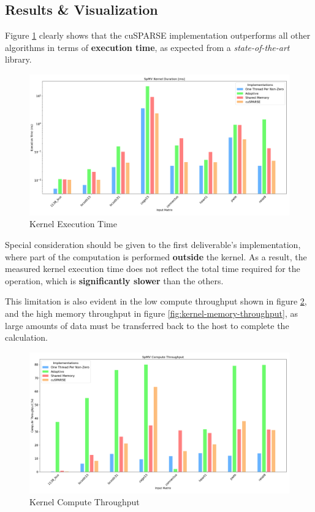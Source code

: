 \documentclass[conference]{IEEEtran}
\begin{document}
        \subsection{Results \& Visualization}

        Figure \ref{fig:kernel-duration} clearly shows that the cuSPARSE
        implementation outperforms all other algorithms in terms of
        \textbf{execution time}, as expected from a \textit{state-of-the-art}
        library.

        \begin{figure}[ht]
            \centering
            \includegraphics[width=\linewidth]{kernel-duration.png}
            \caption{Kernel Execution Time}
            \label{fig:kernel-duration}
        \end{figure}

        Special consideration should be given to the first deliverable’s
        implementation, where part of the computation is performed
        \textbf{outside} the kernel.
        As a result, the measured kernel execution time does not reflect the
        total time required for the operation, which is \textbf{significantly
        slower} than the others.

        This limitation is also evident in the low compute throughput shown in
        figure \ref{fig:kernel-compute-throughput}, and the high memory
        throughput in figure \ref{fig:kernel-memory-throughput}, as large
        amounts of data must be transferred back to the host to complete the
        calculation.

        \begin{figure}[ht]
            \centering
            \includegraphics[width=\linewidth]{kernel-compute-throughput.png}
            \caption{Kernel Compute Throughput}
            \label{fig:kernel-compute-throughput}
        \end{figure}
\end{document}
